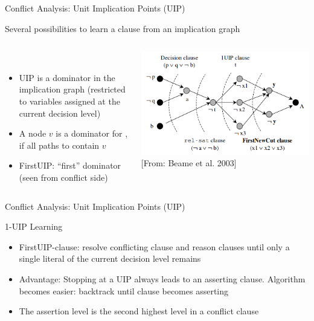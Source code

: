 \documentclass[t]{sdqbeamer}
\begin{document}
\begin{frame}{Conflict Analysis: Unit Implication Points (UIP)}
\begin{block}{Several possibilities to learn a clause from an implication graph}
\begin{columns}[T]
\begin{column}{0.5\textwidth}
	~\\[1ex]
	\begin{itemize}\setlength{\itemsep}{1ex}
		\item UIP is a dominator in the implication graph (restricted to variables assigned at the current
		decision level)
		\item A node $v$ is a dominator for \blitz, if all paths to \blitz contain $v$
		\item FirstUIP: ``first'' dominator (seen from conflict side)
	\end{itemize}
\end{column}
\begin{column}{0.5\textwidth}
	\includegraphics[width=\linewidth]{figures/l04/implicationgraphcuts.png}
	\hfill*\footnotesize{[From: Beame et al. 2003]}
\end{column}
\end{columns}
\end{block}%
\end{frame}
			
			
\begin{frame}{Conflict Analysis: Unit Implication Points (UIP)}
\begin{block}{1-UIP Learning}
\begin{itemize}\setlength{\itemsep}{1em}
\item FirstUIP-clause: resolve conflicting clause and reason clauses until only a single literal of the current decision level remains 
\item Advantage: Stopping at a UIP always leads to an asserting clause. Algorithm becomes easier: backtrack until clause becomes asserting
\item The assertion level is the second highest level in a conflict clause
\end{itemize}
\end{block}
\end{frame}
\end{document}
